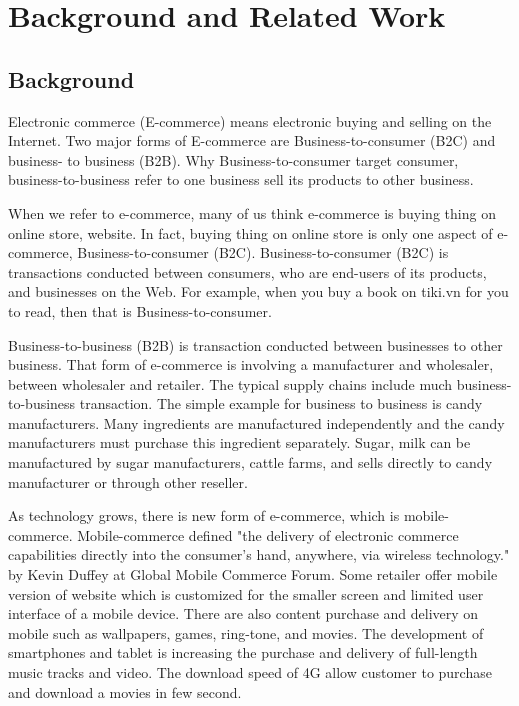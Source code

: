 \documentclass[conference]{IEEEtran}
\begin{document}


\section{Background and Related Work} \label{background}
\subsection{Background}
Electronic commerce (E-commerce) means electronic buying and selling on the Internet. \cite{bidgoli2002electronic} Two major forms of E-commerce are Business-to-consumer (B2C) and business- to business (B2B). Why Business-to-consumer target consumer, business-to-business refer to one business sell its products to other business. \cite{readingEcommerce2009}

When we refer to e-commerce, many of us think e-commerce is buying thing on online store, website. In fact, buying thing on online store is only one aspect of e-commerce, Business-to-consumer (B2C). Business-to-consumer (B2C) is transactions conducted between consumers, who are end-users of its products, and businesses on the Web. \cite{ec2010Gary} For example, when you buy a book on tiki.vn for you to read, then that is Business-to-consumer.

Business-to-business (B2B) is transaction conducted between businesses to other business. \cite{ec2010Gary} That form of e-commerce is involving a manufacturer and wholesaler, between wholesaler and retailer. \cite{btb2015} The typical supply chains include much business-to-business transaction. \cite{btb2015} The simple example for business to business is candy manufacturers. Many ingredients are manufactured independently and the candy manufacturers must purchase this ingredient separately. Sugar, milk can be manufactured by sugar manufacturers, cattle farms, and sells directly to candy manufacturer or through other reseller.

As technology grows, there is new form of e-commerce, which is mobile-commerce. Mobile-commerce defined "the delivery of electronic commerce capabilities directly into the consumer’s hand, anywhere, via wireless technology." by Kevin Duffey at Global Mobile Commerce Forum. Some retailer offer mobile version of website which is customized for the smaller screen and limited user interface of a mobile device. \cite{ectomobile2015} There are also content purchase and delivery on mobile such as wallpapers, games, ring-tone, and movies. The development of smartphones and tablet is increasing the purchase and delivery of full-length music tracks and video. The download speed of 4G allow customer to purchase and download a movies in few second. \cite{niranjanamurthy2013analysis}
\end{document}
